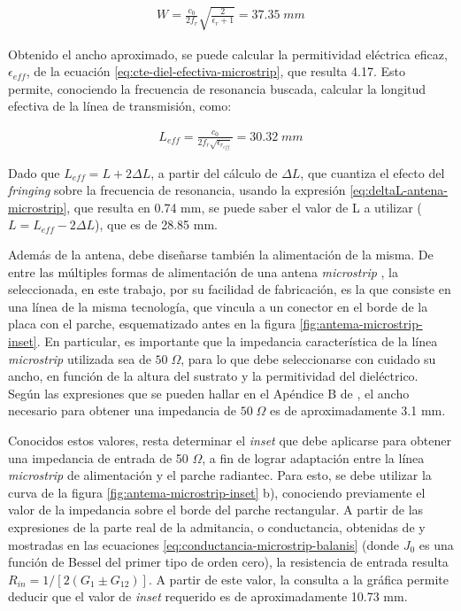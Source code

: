 \begin{align}
	W = \frac{c_0}{2 f_r} \sqrt{\frac{2}{\epsilon_r+1}} = 37.35\; mm
\end{align}

Obtenido el ancho aproximado, se puede calcular la permitividad eléctrica eficaz, $\epsilon_{eff}$, de la ecuación \ref{eq:cte-diel-efectiva-microstrip}, que resulta 4.17. Esto permite, conociendo la frecuencia de resonancia buscada, calcular la longitud efectiva de la línea de transmisión, como:

\begin{align}
	L_{eff} = \frac{c_0}{2 f_r \sqrt{\epsilon_{r_{eff}}}} = 30.32\; mm
\end{align}

Dado que $L_{eff} = L + 2 \Delta L$, a partir del cálculo de $\Delta L$, que cuantiza el efecto del \textit{fringing} sobre la frecuencia de resonancia, usando la expresión \ref{eq:deltaL-antena-microstrip}, que resulta en 0.74 mm, se puede saber el valor de L a utilizar ($L = L_{eff} - 2 \Delta L$), que es de 28.85 mm.

Además de la antena, debe diseñarse también la alimentación de la misma. De entre las múltiples formas de alimentación de una antena \textit{microstrip} \cite{Barthia:Handbook}, la seleccionada, en este trabajo, por su facilidad de fabricación, es la que consiste en una línea de la misma tecnología, que vincula a un conector en el borde de la placa con el parche, esquematizado antes en la figura \ref{fig:antema-microstrip-inset}. En particular, es importante que la impedancia característica de la línea \textit{microstrip} utilizada sea de $50\;\Omega$, para lo que debe seleccionarse con cuidado su ancho, en función de la altura del sustrato y la permitividad del dieléctrico. Según las expresiones que se pueden hallar en el Apéndice B de \cite{Barthia:Handbook}, el ancho necesario para obtener una impedancia de $50\;\Omega$ es de aproximadamente 3.1 mm.

Conocidos estos valores, resta determinar el \textit{inset} que debe aplicarse para obtener una impedancia de entrada de 50 $\Omega$, a fin de lograr adaptación entre la línea \textit{microstrip} de alimentación y el parche radiantec. Para esto, se debe utilizar la curva de la figura \ref{fig:antema-microstrip-inset} b), conociendo previamente el valor de la impedancia sobre el borde del parche rectangular. A partir de las expresiones de la parte real de la admitancia, o conductancia, obtenidas de \cite{Balanis:Theory} y mostradas en las ecuaciones \ref{eq:conductancia-microstrip-balanis} (donde $J_0$ es una función de Bessel del primer tipo de orden cero), la resistencia de entrada resulta $R_{in} = 1/[2(G_1 \pm G_{12})]$. A partir de este valor, la consulta a la gráfica permite deducir que el valor de \textit{inset} requerido es de aproximadamente 10.73 mm.

